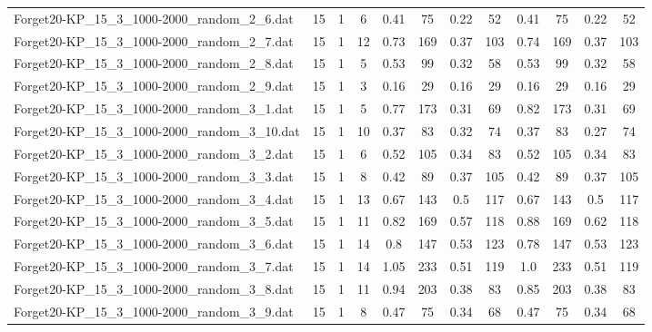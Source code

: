 \begin{sidewaystable}[!ht]
{\begin{tabular}{lccccccccccc}
Forget20-KP\_15\_3\_1000-2000\_random\_2\_6.dat & 15 & 1 & 6 & 0.41 & 75 &  \textcolor{blue2}{0.22} & 52 & 0.41 & 75 &  \textcolor{blue2}{0.22} & 52 \\
Forget20-KP\_15\_3\_1000-2000\_random\_2\_7.dat & 15 & 1 & 12 & 0.73 & 169 &  \textcolor{blue2}{0.37} & 103 & 0.74 & 169 &  \textcolor{blue2}{0.37} & 103 \\
Forget20-KP\_15\_3\_1000-2000\_random\_2\_8.dat & 15 & 1 & 5 & 0.53 & 99 &  \textcolor{blue2}{0.32} & 58 & 0.53 & 99 &  \textcolor{blue2}{0.32} & 58 \\
Forget20-KP\_15\_3\_1000-2000\_random\_2\_9.dat & 15 & 1 & 3 &  \textcolor{blue2}{0.16} & 29 &  \textcolor{blue2}{0.16} & 29 &  \textcolor{blue2}{0.16} & 29 &  \textcolor{blue2}{0.16} & 29 \\
Forget20-KP\_15\_3\_1000-2000\_random\_3\_1.dat & 15 & 1 & 5 & 0.77 & 173 &  \textcolor{blue2}{0.31} & 69 & 0.82 & 173 &  \textcolor{blue2}{0.31} & 69 \\
Forget20-KP\_15\_3\_1000-2000\_random\_3\_10.dat & 15 & 1 & 10 & 0.37 & 83 & 0.32 & 74 & 0.37 & 83 &  \textcolor{blue2}{0.27} & 74 \\
Forget20-KP\_15\_3\_1000-2000\_random\_3\_2.dat & 15 & 1 & 6 & 0.52 & 105 &  \textcolor{blue2}{0.34} & 83 & 0.52 & 105 &  \textcolor{blue2}{0.34} & 83 \\
Forget20-KP\_15\_3\_1000-2000\_random\_3\_3.dat & 15 & 1 & 8 & 0.42 & 89 &  \textcolor{blue2}{0.37} & 105 & 0.42 & 89 &  \textcolor{blue2}{0.37} & 105 \\
Forget20-KP\_15\_3\_1000-2000\_random\_3\_4.dat & 15 & 1 & 13 & 0.67 & 143 &  \textcolor{blue2}{0.5} & 117 & 0.67 & 143 &  \textcolor{blue2}{0.5} & 117 \\
Forget20-KP\_15\_3\_1000-2000\_random\_3\_5.dat & 15 & 1 & 11 & 0.82 & 169 &  \textcolor{blue2}{0.57} & 118 & 0.88 & 169 & 0.62 & 118 \\
Forget20-KP\_15\_3\_1000-2000\_random\_3\_6.dat & 15 & 1 & 14 & 0.8 & 147 &  \textcolor{blue2}{0.53} & 123 & 0.78 & 147 &  \textcolor{blue2}{0.53} & 123 \\
Forget20-KP\_15\_3\_1000-2000\_random\_3\_7.dat & 15 & 1 & 14 & 1.05 & 233 &  \textcolor{blue2}{0.51} & 119 & 1.0 & 233 &  \textcolor{blue2}{0.51} & 119 \\
Forget20-KP\_15\_3\_1000-2000\_random\_3\_8.dat & 15 & 1 & 11 & 0.94 & 203 &  \textcolor{blue2}{0.38} & 83 & 0.85 & 203 &  \textcolor{blue2}{0.38} & 83 \\
Forget20-KP\_15\_3\_1000-2000\_random\_3\_9.dat & 15 & 1 & 8 & 0.47 & 75 &  \textcolor{blue2}{0.34} & 68 & 0.47 & 75 &  \textcolor{blue2}{0.34} & 68 \\

\end{tabular}}
\end{sidewaystable}
